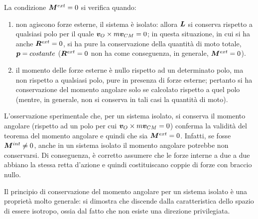 La condizione $\bm{M}^{ext}=0$ si verifica quando:
\begin{enumerate}
    \item non agiscono forze esterne, il sistema è isolato: allora $\bm{L}$ si conserva rispetto a qualsiasi polo per il quale $\bm{v}_O\times m\bm{v}_{CM}=0$; in questa situazione, in cui si ha anche $\bm{R}^{ext}=0$, si ha pure la conservazione della quantità di moto totale, $\bm{p}=costante$ ($\bm{R}^{ext}=0$ non ha come conseguenza, in generale, $\bm{M}^{ext}=0$).
    \item il momento delle forze esterne è nullo rispetto ad un determinato  polo, ma non rispetto a qualsiasi polo, pure in presenza di forze esterne; pertanto si ha conservazione del momento angolare solo se calcolato rispetto a quel polo (mentre, in generale, non si conserva in tali casi la quantità di moto).
\end{enumerate}
L'osservazione sperimentale che, per un sistema isolato, si conserva il momento angolare (rispetto ad un polo per cui $\bm{v}_O\times m\bm{v}_{CM}=0$) conferma la validità del teorema del momento angolare e quindi che sia $\bm{M}^{ext}=0$. Infatti, se fosse $\bm{M}^{int}\neq0$, anche in un sistema isolato il momento angolare potrebbe non conservarsi. Di conseguenza, è corretto assumere che le forze interne a due a due abbiano la stessa retta d'azione e quindi costituiscano coppie di forze con braccio nullo. 
\begin{obs}
    Il principio di conservazione del momento angolare per un sistema isolato è una proprietà molto generale: si dimostra che discende dalla caratteristica dello spazio di essere isotropo, ossia dal fatto che non esiste una direzione privilegiata.
\end{obs}

